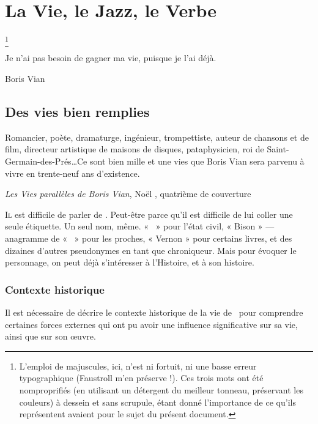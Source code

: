 \mainmatter
\chapter{La Vie, le Jazz, le Verbe}\footnote{L'emploi de majuscules, ici,
n'est ni fortuit, ni une basse erreur typographique (Faustroll m'en préserve !).
Ces trois mots ont été nomproprifiés (en utilisant un détergent du
meilleur tonneau, préservant les couleurs) à dessein et sans scrupule,
étant donné l'importance de ce qu'ils représentent avaient pour le sujet du
présent document.}
\epigraph{%
Je n'ai pas besoin de gagner ma vie, puisque je l'ai déjà.}{Boris Vian}
\vfill
\pagebreak
\section{Des vies bien remplies}
\epigraph{Romancier, poète, dramaturge, ingénieur, trompettiste, auteur
de chansons et de film, directeur artistique de maisons de disques, pataphysicien, roi
de Saint-Germain-des-Prés\ldots Ce sont bien mille et une vies que Boris Vian sera parvenu
à vivre en trente-neuf ans d'existence.}
{\emph{Les Vies parallèles de Boris Vian}, Noël , quatrième de couverture}


\lettrine{I}l est difficile de parler de \BV. Peut-être parce qu'il
est difficile de lui coller une seule étiquette. Un seul nom,
même. « \BV\ » pour l'état civil, « Bison  » --- anagramme
de « \BV\ » pour les proches, « Vernon  » pour certains
livres, et des dizaines d'autres pseudonymes en tant que chroniqueur.
Mais pour évoquer le personnage, on peut déjà s'intéresser à l'Histoire,
et à son histoire.


\subsection{Contexte historique}
Il est nécessaire de décrire le contexte historique de la vie
de \BV\ pour comprendre certaines forces externes qui
ont pu avoir une influence significative sur sa vie, ainsi que
sur son  \oe{}uvre.

